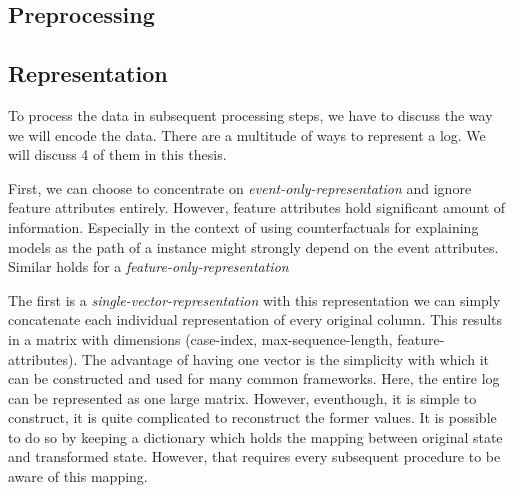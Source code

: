 \documentclass[./../../paper.tex]{subfiles}
\begin{document}
\subsection{Preprocessing}
\label{sec:preprocessing}

\subsection{Representation}
\label{sec:representation}
To process the data in subsequent processing steps, we have to discuss the way we will encode the data. There are a multitude of ways to represent a log. We will discuss 4 of them in this thesis. 

First, we can choose to concentrate on \emph{event-only-representation} and ignore feature attributes entirely. However, feature attributes hold significant amount of information. Especially in the context of using counterfactuals for explaining models as the path of a \gls{instance} might strongly depend on the event attributes. Similar holds for a \emph{feature-only-representation} 

The first is a \emph{single-vector-representation} with this representation we can simply concatenate each individual representation of every original column. This results in a matrix with dimensions (case-index, max-sequence-length, feature-attributes). The advantage of having one vector is the simplicity with which it can be constructed and used for many common frameworks. Here, the entire log can be represented as one large matrix. However, eventhough, it is simple to construct, it is quite complicated to reconstruct the former values. It is possible to do so by keeping a dictionary which holds the mapping between original state and transformed state. However, that requires every subsequent procedure to be aware of this mapping. 
\end{document}
